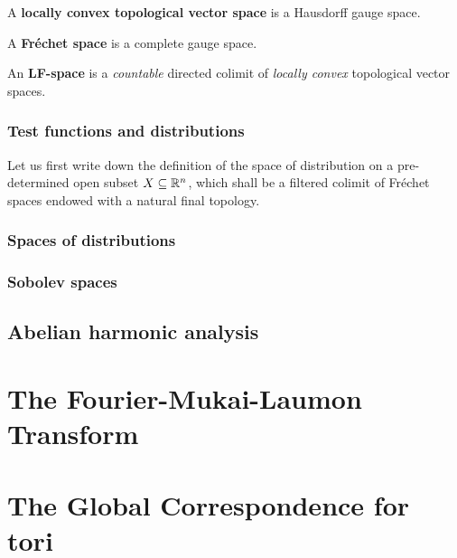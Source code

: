                 \begin{definition} \label{def: locally_convex_topological_vector_spaces}
                    A \textbf{locally convex topological vector space} is a Hausdorff gauge space. 
                \end{definition}
                
                \begin{definition} \label{def: frechet_spaces}
                    A \textbf{Fr\'echet space} is a complete gauge space.
                \end{definition}
                
                \begin{definition}[LF-spaces] \label{def: LF_spaces}
                    An \textbf{LF-space} is a \textit{countable} directed colimit of \textit{locally convex} topological vector spaces.
                \end{definition}
                
            \subsubsection{Test functions and distributions}
                Let us first write down the definition of the space of distribution on a pre-determined open subset $X \subseteq \mathbb{R}^n$, which shall be a filtered colimit of Fr\'echet spaces endowed with a natural final topology.
                \begin{definition}[Distributions] \label{def: distributions}
                    
                \end{definition}
            
            \subsubsection{Spaces of distributions}
        
            \subsubsection{Sobolev spaces}
            
        \subsection{Abelian harmonic analysis}
    
    \section{The Fourier-Mukai-Laumon Transform}
    
    \section{The Global Correspondence for tori}